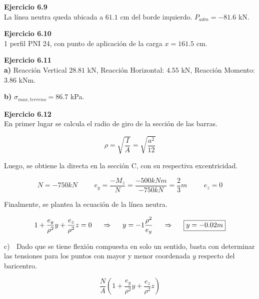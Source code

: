 \textbf{Ejercicio 6.9}\\

La línea neutra queda ubicada a $61.1$ cm del borde izquierdo. $P_{adm} = -81.6$ kN.\newline

\textbf{Ejercicio 6.10}\\

1 perfil PNI 24, con punto de aplicación de la carga $x = 161.5$ cm.\newline

\textbf{Ejercicio 6.11}\\

\textbf{a)}  Reacción Vertical $28.81$ kN, Reacción Horizontal: $4.55$ kN, Reacción Momento: $3.86$ kNm.

\textbf{b)} $\sigma_{max,terreno} = 86.7$ kPa.\newline



\textbf{Ejercicio 6.12}\\

En primer lugar se calcula el radio de giro de la sección de las barras. 

$$\rho = \sqrt{\frac{I}{A}} = \sqrt{\frac{a^2}{12}}$$

Luego, se obtiene la directa en la sección C, con su respectiva excentricidad. 

$$ N = -750kN \hspace{1cm} e_y = \frac{-M_z}{N} = \frac{-500kNm}{-750kN} = \frac{2}{3}m\hspace{1cm} e_z = 0$$

Finalmente, se plantea la ecuación de la línea neutra.

$$ 1+ \frac{e_y}{\rho^2} y + \frac{e_z}{\rho^2} z = 0 \hspace{0.5cm} \Rightarrow \hspace{0.5cm} y = -1 \frac{\rho^2}{e_y} \hspace{0.5cm} \Rightarrow \hspace{0.5cm} \boxed{y = -0.02m}$$

c) $\;$ Dado que se tiene flexión compuesta en solo un sentido, basta con determinar las tensiones para los puntos con mayor y menor coordenada $y$ respecto del baricentro.

$$ \frac{N}{A} \left ( 1 +  \frac{e_y}{\rho^2} y + \frac{e_z}{\rho^2} z  \right )$$

